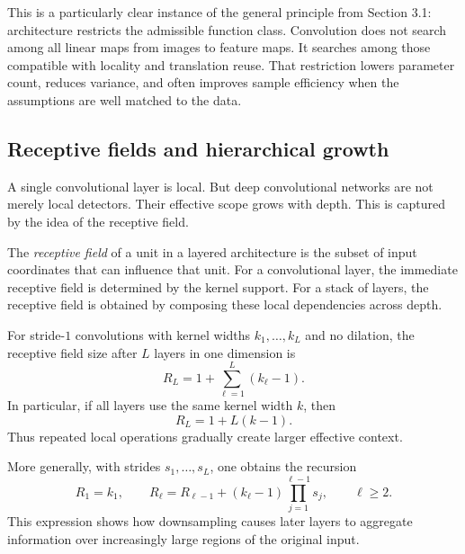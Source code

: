 \medskip

This is a particularly clear instance of the general principle from Section 3.1:
architecture restricts the admissible function class.
Convolution does not search among all linear maps from images to feature maps.
It searches among those compatible with locality and translation reuse.
That restriction lowers parameter count, reduces variance, and often improves sample efficiency when the assumptions are well matched to the data.

\subsection*{Receptive fields and hierarchical growth}

A single convolutional layer is local.
But deep convolutional networks are not merely local detectors.
Their effective scope grows with depth.
This is captured by the idea of the receptive field.

\begin{definition}
The \emph{receptive field} of a unit in a layered architecture is the subset of input coordinates that can influence that unit.
For a convolutional layer, the immediate receptive field is determined by the kernel support.
For a stack of layers, the receptive field is obtained by composing these local dependencies across depth.
\end{definition}

For stride-$1$ convolutions with kernel widths $k_1,\dots,k_L$ and no dilation, the receptive field size after $L$ layers in one dimension is
\[
R_L = 1 + \sum_{\ell=1}^{L} (k_{\ell}-1).
\]
In particular, if all layers use the same kernel width $k$, then
\[
R_L = 1 + L(k-1).
\]
Thus repeated local operations gradually create larger effective context.

More generally, with strides $s_1,\dots,s_L$, one obtains the recursion
\[
R_1 = k_1,
\qquad
R_{\ell} = R_{\ell-1} + (k_{\ell}-1)\prod_{j=1}^{\ell-1} s_j,
\qquad \ell \ge 2.
\]
This expression shows how downsampling causes later layers to aggregate information over increasingly large regions of the original input.

